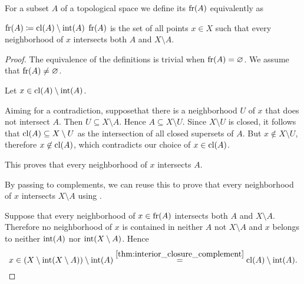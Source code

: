 \begin{definition}\label{def:topological_boundary}
  For a subset \( A \) of a topological space we define its  \( \operatorname{fr}(A) \) equivalently as
  \begin{thmenum}
     \( \operatorname{fr}(A) \coloneqq \operatorname{cl}(A) \setminus \operatorname{int}(A) \)
     \( \operatorname{fr}(A) \) is the set of all points \( x \in X \) such that every neighborhood of \( x \) intersects both \( A \) and \( X \setminus A \).
  \end{thmenum}
\end{definition}
\begin{proof}
  The equivalence of the definitions is trivial when \( \operatorname{fr}(A) = \varnothing \). We assume that \( \operatorname{fr}(A) \neq \varnothing \).

   Let \( x \in \operatorname{cl}(A) \setminus \operatorname{int}(A) \).

  Aiming for a contradiction, suppose\LEM that there is a neighborhood \( U \) of \( x \) that does not intersect \( A \). Then \( U \subseteq X \setminus A \). Hence \( A \subseteq X \setminus U \). Since \( X \setminus U \) is closed, it follows that \( \operatorname{cl}(A) \subseteq X \setminus U \) as the intersection of all closed supersets of \( A \). But \( x \not\in X \setminus U \), therefore \( x \not\in \operatorname{cl}(A) \), which contradicts our choice of \( x \in \operatorname{cl}(A) \).

  This proves that every neighborhood of \( x \) intersects \( A \).

  By passing to complements, we can reuse this to prove that every neighborhood of \( x \) intersects \( X \setminus A \) using .

   Suppose that every neighborhood of \( x \in \operatorname{fr}(A) \) intersects both \( A \) and \( X \setminus A \). Therefore no neighborhood of \( x \) is contained in neither \( A \) not \( X \setminus A \) and \( x \) belongs to neither \( \operatorname{int}(A) \) nor \( \operatorname{int}(X \setminus A) \). Hence
  \begin{equation*}
    x \in (X \setminus \operatorname{int}(X \setminus A)) \setminus \operatorname{int}(A) \overset {\ref{thm:interior_closure_complement}} = \operatorname{cl}(A) \setminus \operatorname{int}(A).
  \end{equation*}
\end{proof}

